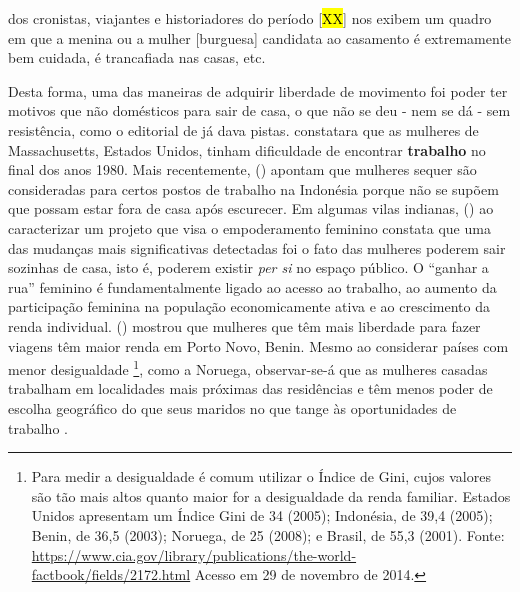 \begin{citacao}
dos cronistas, viajantes e historiadores do período [\hl{XX}] nos exibem um quadro em que a menina ou a mulher [burguesa] candidata ao casamento é extremamente bem cuidada, é trancafiada nas casas, etc.
\end{citacao}




Desta forma, uma das maneiras de adquirir liberdade de movimento foi poder ter motivos que não domésticos para sair de casa, o que não se deu - nem se dá - sem resistência, como o editorial de  já dava pistas.  constatara que as mulheres de Massachusetts, Estados Unidos, tinham dificuldade de encontrar \textbf{trabalho} no final dos anos 1980.
Mais recentemente, 
 (\citeyear{ELMHIRST2003}) apontam que mulheres sequer são consideradas para certos postos de trabalho na Indonésia porque não se supõem que possam estar fora de casa após escurecer. Em algumas vilas indianas,  (\citeyear{RAJU2005}) ao caracterizar um projeto que visa o empoderamento feminino constata que uma das mudanças mais significativas detectadas foi o fato das mulheres poderem sair sozinhas de casa, isto é, poderem existir \emph{per si} no espaço público.
O ``ganhar a rua'' feminino é fundamentalmente ligado ao acesso ao trabalho, ao aumento da participação feminina na população economicamente ativa  e ao crescimento da renda individual.   (\citeyear{MANDEL2004}) mostrou que mulheres que têm mais liberdade para fazer viagens têm maior renda em Porto Novo, Benin.
Mesmo ao considerar países com menor desigualdade
\footnote{Para medir a desigualdade é comum utilizar o Índice de Gini, cujos valores são tão mais altos quanto maior for a desigualdade da renda familiar. Estados Unidos apresentam um Índice Gini de 34 (2005); Indonésia, de 39,4 (2005); Benin, de 36,5 (2003); Noruega, de 25 (2008); e Brasil, de 55,3 (2001). Fonte: \url{https://www.cia.gov/library/publications/the-world-factbook/fields/2172.html} Acesso em 29 de novembro de 2014.}, como a Noruega, observar-se-á que as mulheres casadas trabalham em localidades mais próximas das residências e têm menos poder de escolha geográfico do que seus maridos no que tange às oportunidades de trabalho \cite{HJORTHOL2000}.

